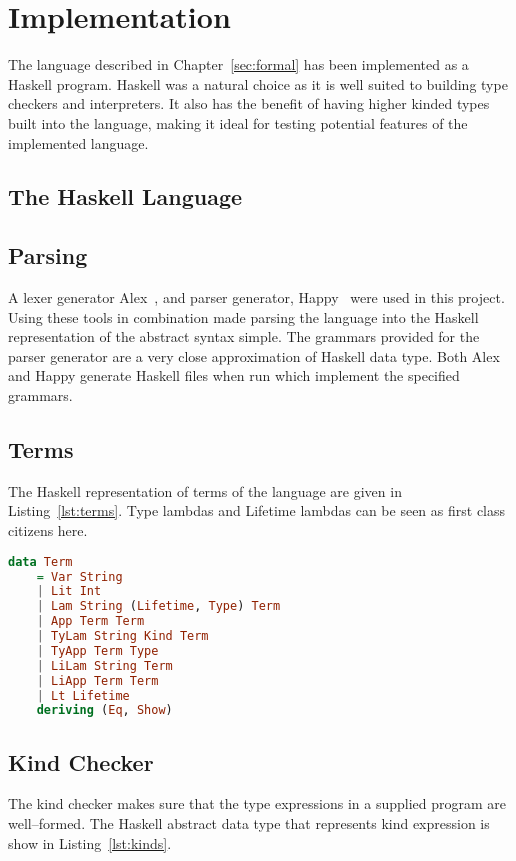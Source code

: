 \chapter{Implementation}\label{sec:impl}
The language described in Chapter~\ref{sec:formal} has been implemented as a
Haskell program. Haskell was a natural choice as it is well suited to building
type checkers and interpreters. It also has the benefit of having higher kinded
types built into the language, making it ideal for testing potential features
of the implemented language.

\section{The Haskell Language}

\section{Parsing}
A lexer generator Alex~\cite{alex}, and parser generator, Happy~\cite{happy}
were used in this project. Using these tools in combination made parsing the
language into the Haskell representation of the abstract syntax simple.
The grammars provided for the parser generator are a very close approximation
of Haskell data type. Both Alex and Happy generate Haskell files when run which
implement the specified grammars.

\section{Terms}
The Haskell representation of terms of the language are given in Listing~\ref{lst:terms}.
Type lambdas and Lifetime lambdas can be seen as first class citizens here.

\begin{lstlisting}[caption=Haskell representation of Terms., language=Haskell, label={lst:terms}]
data Term
    = Var String
    | Lit Int
    | Lam String (Lifetime, Type) Term
    | App Term Term
    | TyLam String Kind Term 
    | TyApp Term Type
    | LiLam String Term
    | LiApp Term Term
    | Lt Lifetime
    deriving (Eq, Show)
\end{lstlisting}

\section{Kind Checker}
The kind checker makes sure that the type expressions in a supplied program are
well--formed. The Haskell abstract data type that represents kind expression is
show in Listing~\ref{lst:kinds}.

